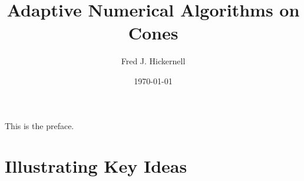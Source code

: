 \documentclass{SIAMbook2019_FJH}
\title{Adaptive Numerical Algorithms on Cones}
\author{Fred J. Hickernell}
\date{\today}
\begin{document}
\maketitle
\frontmatter
\tableofcontents

\begin{contributors}
\end{contributors}

\listoffigures
\listoftables
\listofproblems
\listofalgorithms

\begin{thepreface}
This is the preface.
\end{thepreface}

\mainmatter
\part{Illustrating Key Ideas}



\end{document}
